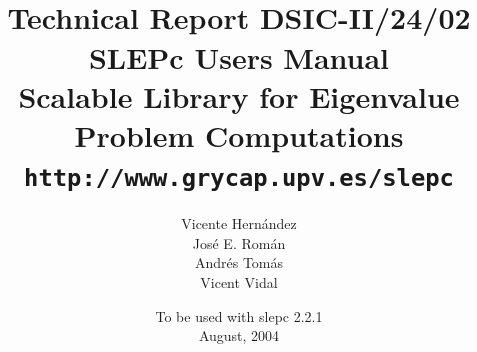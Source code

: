 \documentclass[titlepage,10pt,a4paper]{slepc}
\newcommand{\slepcversion}{2.2.1}
\newcommand{\packnoi}[1]{{\sc #1}\xspace}
\newcommand{\slepc}{\packnoi{slep\rm c}}
\newcommand{\slepchome}{http://www.grycap.upv.es/slepc}
\newcommand{\url}[1]{\texttt{#1}}
\begin{document}
\title{
 	\vspace*{-1cm}
	\\[2cm]
	\normalsize Technical Report DSIC-II/24/02
	\\[2cm]
	\vspace*{6mm}
	{\Large\bf\sffamily 
	SLEPc Users Manual\\[2mm]}
	{\large\bf\sffamily 
	Scalable Library for Eigenvalue Problem Computations}\\[2mm]
	\vspace*{6mm}
	\vspace*{6mm}
	\url{\slepchome}
	\\[6mm]
}

\author{
	Vicente Hern\'andez
	\\
	Jos\'e E. Rom\'an
	\\
	Andr\'es Tom\'as
	\\
	Vicent Vidal
	\\[2cm]
}

\date{
	To be used with \slepc \slepcversion\\
	August, 2004
}

{
\pagestyle{empty}
\maketitle
}

\setlength{\textheight}{14.99cm}
\setlength{\footskip}{2cm}
\setlength{\voffset}{2.3cm}

\pagestyle{empty}
\cleardoublepage
\end{document}
